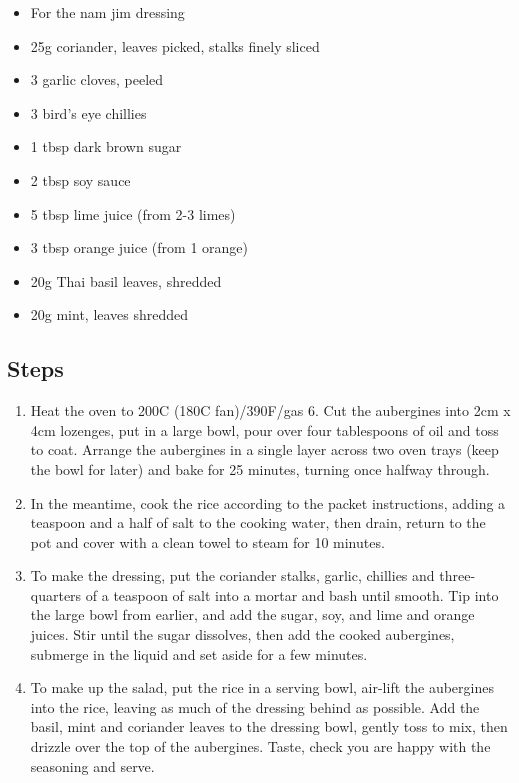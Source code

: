 \documentclass{book}
\begin{document}
\begin{itemize}
\item For the nam jim dressing
\item 25g coriander, leaves picked, stalks finely sliced
\item 3 garlic cloves, peeled 
\item 3 bird’s eye chillies 
\item 1 tbsp dark brown sugar 
\item 2 tbsp soy sauce 
\item 5 tbsp lime juice (from 2-3 limes)
\item 3 tbsp orange juice (from 1 orange)
\item 20g Thai basil leaves, shredded 
\item 20g mint, leaves shredded
\end{itemize}

\subsection*{Steps}
\begin{enumerate}
\item Heat the oven to 200C (180C fan)/390F/gas 6. Cut the aubergines into 2cm x 4cm lozenges, put in a large bowl, pour over four tablespoons of oil and toss to coat. Arrange the aubergines in a single layer across two oven trays (keep the bowl for later) and bake for 25 minutes, turning once halfway through.
\item In the meantime, cook the rice according to the packet instructions, adding a teaspoon and a half of salt to the cooking water, then drain, return to the pot and cover with a clean towel to steam for 10 minutes.
\item To make the dressing, put the coriander stalks, garlic, chillies and three-quarters of a teaspoon of salt into a mortar and bash until smooth. Tip into the large bowl from earlier, and add the sugar, soy, and lime and orange juices. Stir until the sugar dissolves, then add the cooked aubergines, submerge in the liquid and set aside for a few minutes.
\item To make up the salad, put the rice in a serving bowl, air-lift the aubergines into the rice, leaving as much of the dressing behind as possible. Add the basil, mint and coriander leaves to the dressing bowl, gently toss to mix, then drizzle over the top of the aubergines. Taste, check you are happy with the seasoning and serve.
\end{enumerate}
\newpage
\end{document}
